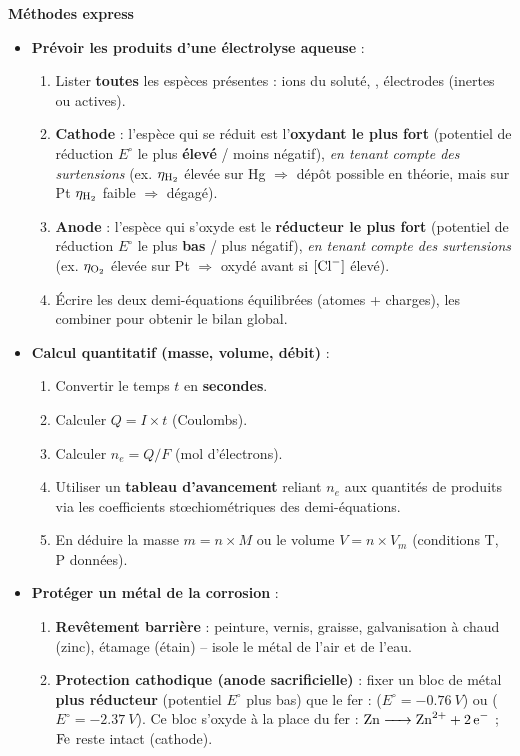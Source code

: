\documentclass[11pt]{article}
\begin{document}
\begin{definition}
\textbf{Méthodes express}
\begin{itemize}
  \item \textbf{Prévoir les produits d'une électrolyse aqueuse} :
  \begin{enumerate}
    \item Lister \textbf{toutes} les espèces présentes : ions du soluté, , électrodes (inertes ou actives).
    \item \textbf{Cathode} : l'espèce qui se réduit est l'\textbf{oxydant le plus fort} (potentiel de réduction $E^\circ$ le plus \textbf{élevé} / moins négatif), \emph{en tenant compte des surtensions} (ex. $\eta_{\ce{H2}}$ élevée sur Hg $\Rightarrow$ dépôt  possible en théorie, mais sur Pt $\eta_{\ce{H2}}$ faible $\Rightarrow$  dégagé).
    \item \textbf{Anode} : l'espèce qui s'oxyde est le \textbf{réducteur le plus fort} (potentiel de réduction $E^\circ$ le plus \textbf{bas} / plus négatif), \emph{en tenant compte des surtensions} (ex. $\eta_{\ce{O2}}$ élevée sur Pt $\Rightarrow$  oxydé avant  si $[\ce{Cl-}]$ élevé).
    \item Écrire les deux demi-équations équilibrées (atomes + charges), les combiner pour obtenir le bilan global.
  \end{enumerate}
  \item \textbf{Calcul quantitatif (masse, volume, débit)} :
  \begin{enumerate}
    \item Convertir le temps $t$ en \textbf{secondes}.
    \item Calculer $Q = I \times t$ (Coulombs).
    \item Calculer $n_e = Q / F$ (mol d'électrons).
    \item Utiliser un \textbf{tableau d'avancement} reliant $n_e$ aux quantités de produits via les coefficients stœchiométriques des demi-équations.
    \item En déduire la masse $m = n \times M$ ou le volume $V = n \times V_m$ (conditions T, P données).
  \end{enumerate}
  \item \textbf{Protéger un métal de la corrosion} :
  \begin{enumerate}
    \item \textbf{Revêtement barrière} : peinture, vernis, graisse, galvanisation à chaud (zinc), étamage (étain) -- isole le métal de l'air et de l'eau.
    \item \textbf{Protection cathodique (anode sacrificielle)} : fixer un bloc de métal \textbf{plus réducteur} (potentiel $E^\circ$ plus bas) que le fer :  ($E^\circ = -\SI{0,76}{V}$) ou  ($E^\circ = -\SI{2,37}{V}$). Ce bloc s'oxyde à la place du fer : $\ce{Zn -> Zn^2+ + 2e-}$ ; $\ce{Fe}$ reste intact (cathode).
  \end{enumerate}
\end{itemize}
\end{definition}
\end{document}
